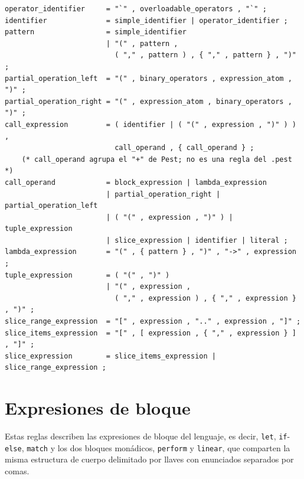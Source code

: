 \begin{lstlisting}[language={}, caption=Reglas de las expresiones átomo]
operator_identifier     = "`" , overloadable_operators , "`" ;
identifier              = simple_identifier | operator_identifier ;
pattern                 = simple_identifier
                        | "(" , pattern ,
                          ( "," , pattern ) , { "," , pattern } , ")" ;
partial_operation_left  = "(" , binary_operators , expression_atom , ")" ;
partial_operation_right = "(" , expression_atom , binary_operators , ")" ;
call_expression         = ( identifier | ( "(" , expression , ")" ) ) ,
                          call_operand , { call_operand } ;
    (* call_operand agrupa el "+" de Pest; no es una regla del .pest *)
call_operand            = block_expression | lambda_expression
                        | partial_operation_right | partial_operation_left
                        | ( "(" , expression , ")" ) | tuple_expression
                        | slice_expression | identifier | literal ;
lambda_expression       = "(" , { pattern } , ")" , "->" , expression ;
tuple_expression        = ( "(" , ")" )
                        | "(" , expression ,
                          ( "," , expression ) , { "," , expression } , ")" ;
slice_range_expression  = "[" , expression , ".." , expression , "]" ;
slice_items_expression  = "[" , [ expression , { "," , expression } ] , "]" ;
slice_expression        = slice_items_expression | slice_range_expression ;
\end{lstlisting}

\section{Expresiones de bloque}
\label{sec:ebnf-bloques}

Estas reglas describen las expresiones de bloque del lenguaje, es decir, \lstinline|let|, \lstinline|if|-\lstinline|else|, \lstinline|match| y los dos bloques monádicos, \lstinline|perform| y \lstinline|linear|, que comparten la misma estructura de cuerpo delimitado por llaves con enunciados separados por comas.

